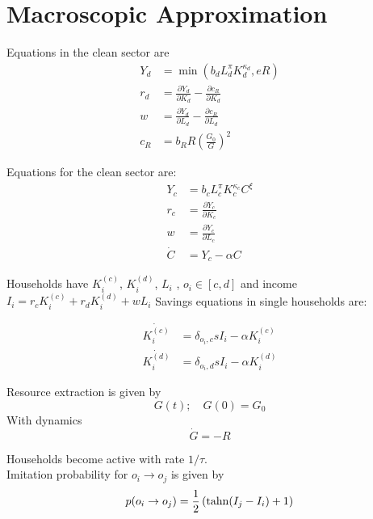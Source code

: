 \section{Macroscopic Approximation}

Equations in the clean sector are
\begin{align}
	Y_d &= \min(b_d L_d^{\pi}K_d^{\kappa_d}, eR) \nonumber \\
	r_d &= \frac{\partial Y_d}{\partial K_d} - \frac{\partial c_R}{\partial K_d} \nonumber \\
	w &=  \frac{\partial Y_d}{\partial L_d} - \frac{\partial c_R}{\partial L_d} \nonumber \\
	c_R &= b_R R \left( \frac{G_0}{G} \right)^2 \nonumber
\end{align}

Equations for the clean sector are:
\begin{align}
	Y_c &= b_c L_c^{\pi}K_c^{\kappa_c} C^{\xi} \nonumber \\
	r_c &= \frac{\partial Y_c}{\partial K_c} \nonumber \\
	w &=  \frac{\partial Y_c}{\partial L_c} \nonumber \\
	\dot{C} &= Y_c - \alpha C \nonumber 
\end{align}

Households have $K_i^{(c)}$, $K_i^{(d)}$,  $L_i$ , $o_i \in [c, d]$ and income $I_i = r_c K_{i}^{(c)} + r_d K_i^{(d)} + w L_i$
Savings equations in single households are:

\begin{align}
	\dot{K_i^{(c)}} &= \delta_{o_i, c} s I_i - \alpha K_i^{(c)} \nonumber \\
	\dot{K_i^{(d)}} &= \delta_{o_i, d} s I_i - \alpha K_i^{(d)} \nonumber
\end{align}

Resource extraction is given by
\begin{equation}
	G(t); \quad G(0) = G_0 \nonumber
\end{equation}
With dynamics
\begin{equation}
	\dot{G} = -R \nonumber
\end{equation}

Households become active with rate $1/\tau$. \\
Imitation probability for $o_i \rightarrow o_j$ is given by 
\begin{equation}
	p(o_i \rightarrow o_j) = \frac{1}{2}\left( {\rm tahn}(I_j - I_i) + 1 \right) \nonumber
\end{equation}

